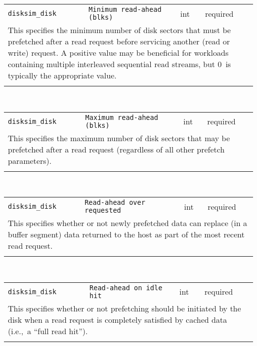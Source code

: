 \noindent 
\begin{tabular}{|p{\lpmodwidth}|p{\lpnamewidth}|p{0.5in}|p{0.5in}|}
\cline{1-4}
\texttt{disksim\_disk} & \texttt{Minimum read-ahead (blks)} & int & required \\ 
\cline{1-4}
\multicolumn{4}{|p{6in}|}{
This specifies the minimum number of disk sectors that must be prefetched
after a read request before servicing another (read or write) request.
A positive value may be beneficial for workloads containing multiple
interleaved sequential read streams, but 0~is typically the
appropriate value.
}\\ 
\cline{1-4}
\multicolumn{4}{p{5in}}{}\\
\end{tabular}\\ 
\noindent 
\begin{tabular}{|p{\lpmodwidth}|p{\lpnamewidth}|p{0.5in}|p{0.5in}|}
\cline{1-4}
\texttt{disksim\_disk} & \texttt{Maximum read-ahead (blks)} & int & required \\ 
\cline{1-4}
\multicolumn{4}{|p{6in}|}{
This specifies the maximum number of disk sectors that may be prefetched
after a read request (regardless of all other prefetch parameters).
}\\ 
\cline{1-4}
\multicolumn{4}{p{5in}}{}\\
\end{tabular}\\ 
\noindent 
\begin{tabular}{|p{\lpmodwidth}|p{\lpnamewidth}|p{0.5in}|p{0.5in}|}
\cline{1-4}
\texttt{disksim\_disk} & \texttt{Read-ahead over requested} & int & required \\ 
\cline{1-4}
\multicolumn{4}{|p{6in}|}{
This specifies whether or not newly prefetched data can replace (in a
buffer segment) data returned to the host as part of the most recent
read request.
}\\ 
\cline{1-4}
\multicolumn{4}{p{5in}}{}\\
\end{tabular}\\ 
\noindent 
\begin{tabular}{|p{\lpmodwidth}|p{\lpnamewidth}|p{0.5in}|p{0.5in}|}
\cline{1-4}
\texttt{disksim\_disk} & \texttt{Read-ahead on idle hit} & int & required \\ 
\cline{1-4}
\multicolumn{4}{|p{6in}|}{
This specifies whether or not prefetching should be initiated by the
disk when a read request is completely satisfied by cached data
(i.e.,~a ``full read hit'').
}\\ 
\cline{1-4}
\multicolumn{4}{p{5in}}{}\\
\end{tabular}\\ 
